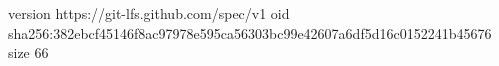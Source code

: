 version https://git-lfs.github.com/spec/v1
oid sha256:382ebcf45146f8ac97978e595ca56303bc99e42607a6df5d16c0152241b45676
size 66
